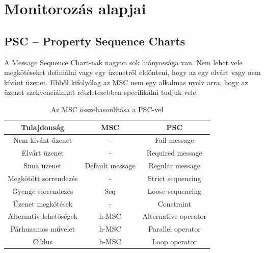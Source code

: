 \chapter{Monitorozás alapjai}
\section{PSC – Property Sequence Charts}
A Message Sequence Chart-nak nagyon sok hiányossága van.
Nem lehet vele megkötéseket definiálni vagy egy üzenetről eldönteni, hogy az egy elvárt vagy nem kívánt üzenet.
Ebből kifolyólag az MSC nem egy alkalmas nyelv arra, hogy az üzenet szekvenciáinkat részletesebben specifikálni tudjuk vele.

\begin{table}[ht]
    \centering %
    \begin{tabular}{ |c|c|c| } %
    \hline
    \textbf{Tulajdonság} & \textbf{MSC} & \textbf{PSC} \\ [0.5ex] %
    \hline %
    \hline
    Nem kivánt üzenet & - & Fail message \\ %
    \hline
    Elvárt üzenet & - & Required message \\
    \hline
    Sima üzenet & Default message & Regular message \\
    \hline
    Megkötött sorrendezés & - & Strict sequencing \\
    \hline
    Gyenge sorrendezés & Seq & Loose sequencing \\
    \hline
    Üzenet megkötések & - & Constraint \\
    \hline
    Alternatív lehetőségek & h-MSC & Alternative operator \\
    \hline
    Párhuzamos művelet & h-MSC & Parallel operator \\
    \hline
    Ciklus & h-MSC & Loop operator \\
    \hline %
    \end{tabular}
    \label{table:nonlin} %
    \caption{Az MSC összehasonlítása a PSC-vel} %
\end{table}

